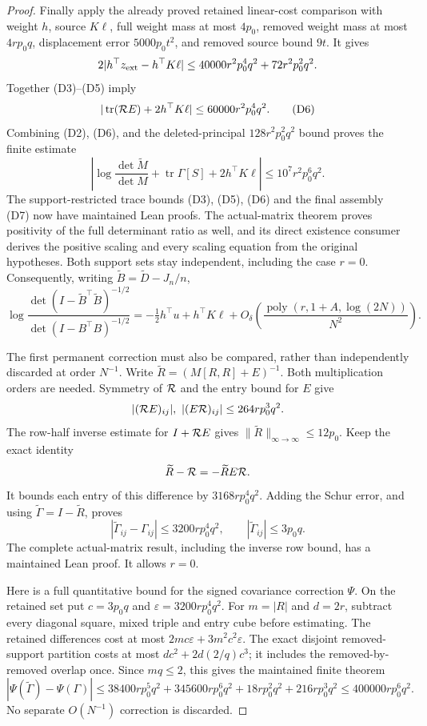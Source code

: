 \begin{proof}
Finally apply the already proved retained linear-cost comparison
with weight \(h\), source \(K\ell\), full weight mass at most
\(4p_0\), removed weight mass at most \(4rp_0q\), displacement
error \(5000p_0t^2\), and removed source bound \(9t\).
It gives
\[
 2|h^\top z_{\rm ext}-h^\top K\ell|
 \leq40000r^2p_0^4q^2+72r^2p_0^2q^2.
\]
Together (D3)--(D5) imply
\[
 |\operatorname{tr}({\cal R}E)+2h^\top K\ell|
                  \leq60000r^2p_0^4q^2.        \tag{D6}
\]
Combining (D2), (D6), and the deleted-principal
\(128r^2p_0^2q^2\) bound proves the finite estimate
\[
 \left|\log\frac{\det\widetilde M}{\det M}
           +\operatorname{tr}\Gamma[S]+2h^\top K\ell\right|
                  \leq10^7r^2p_0^6q^2.        \tag{D7}
\]
The support-restricted trace bounds (D3), (D5), (D6) and
the final assembly (D7) now have maintained Lean proofs.
The actual-matrix theorem proves positivity of the full determinant
ratio as well, and its direct existence consumer derives the positive
scaling and every scaling equation from the original hypotheses.
Both support sets stay independent, including the case \(r=0\).
Consequently, writing \(\widetilde B=\widetilde D-J_n/n\),
\[
 \log\frac{\det(I-\widetilde B^\top\widetilde B)^{-1/2}}
               {\det(I-B^\top B)^{-1/2}}
 =-\tfrac12h^\top u+h^\top K\ell
 +O_\delta\left(
       \frac{\operatorname{poly}(r,1+A,\log(2N))}{N^2}\right).
\]

The first permanent correction must also be compared,
rather than independently discarded at order \(N^{-1}\).
Write \(\widetilde R=(M[R,R]+E)^{-1}\).
Both multiplication orders are needed. Symmetry of \({\cal R}\)
and the entry bound for \(E\) give
\[
 |({\cal R}E)_{ij}|,\ |(E{\cal R})_{ij}|
       \leq264rp_0^3q^2 .
\]
The row-half inverse estimate for \(I+{\cal R}E\) gives
\(\|\widetilde R\|_{\infty\to\infty}\leq12p_0\).
Keep the exact identity
\[
 \widetilde R-{\cal R}=-\widetilde R E{\cal R}.
\]
It bounds each entry of this difference by
\(3168rp_0^4q^2\). Adding the Schur error, and using
\(\widetilde\Gamma=I-\widetilde R\), proves
\[
 |\widetilde\Gamma_{ij}-\Gamma_{ij}|
       \leq3200rp_0^4q^2,\qquad
 |\widetilde\Gamma_{ij}|\leq3p_0q .
 \tag{C1}
\]
The complete actual-matrix result, including the inverse row bound,
has a maintained Lean proof. It allows \(r=0\).

Here is a full quantitative bound for the signed covariance correction
\(\Psi\). On the retained set put \(c=3p_0q\) and
\(\varepsilon=3200rp_0^4q^2\). For \(m=|R|\) and \(d=2r\),
subtract every diagonal square, mixed triple and entry cube before
estimating. The retained differences cost at most
\(2mc\varepsilon+3m^2c^2\varepsilon\).
The exact disjoint removed-support partition costs at most
\(dc^2+2d(2/q)c^3\); it includes the removed-by-removed overlap once.
Since \(mq\leq2\), this gives the maintained finite theorem
\[
 |\Psi(\widetilde\Gamma)-\Psi(\Gamma)|
 \leq38400rp_0^5q^2+345600rp_0^6q^2
                     +18rp_0^2q^2+216rp_0^3q^2
 \leq400000rp_0^6q^2.                         \tag{C2}
\]
No separate \(O(N^{-1})\) correction is discarded.


\end{proof}
